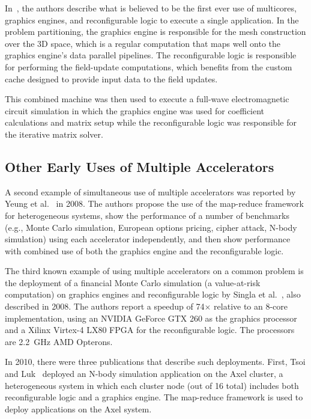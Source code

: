 In~\cite{kdh+06}, the authors describe what is believed to be the first
ever use of multicores, graphics engines, and reconfigurable logic to execute
a single application.  In the problem partitioning, the graphics engine is
responsible for the mesh construction over the 3D space, which is a regular
computation that maps well onto the graphics engine's data parallel pipelines.
The reconfigurable logic is responsible for performing the field-update
computations, which benefits from the custom cache designed to provide input
data to the field updates.

This combined machine was then used to execute a full-wave electromagnetic
circuit simulation in which the graphics engine was used for coefficient
calculations and matrix setup while the reconfigurable logic was responsible
for the iterative matrix solver.

\subsection{Other Early Uses of Multiple Accelerators}

A second example of simultaneous use of multiple accelerators was
reported by Yeung et al.~\cite{ytt+08} in 2008.
The authors propose the use of the map-reduce framework for heterogeneous
systems, show the performance of a number of benchmarks (e.g., Monte Carlo
simulation, European options pricing, cipher attack, N-body simulation)
using each accelerator independently, and then show performance with
combined use of both the graphics engine and the reconfigurable logic.

The third known example of using multiple accelerators on a common
problem is the deployment of a financial Monte Carlo simulation 
(a value-at-risk computation) on
graphics engines and reconfigurable logic by Singla et al.~\cite{shsc08},
also described in 2008.
The authors report a speedup of 74$\times$ relative to an 8-core implementation,
using an NVIDIA GeForce GTX 260 as the graphics processor and
a Xilinx Virtex-4 LX80 FPGA for the reconfigurable logic.
The processors are 2.2~GHz AMD Opterons.

In 2010, there were three publications that describe such deployments.
First, Tsoi and Luk~\cite{tl10} deployed an N-body simulation application
on the Axel cluster, a heterogeneous system in which each cluster node
(out of 16 total)
includes both reconfigurable logic and a graphics engine. The map-reduce
framework is used to deploy applications on the Axel system.

